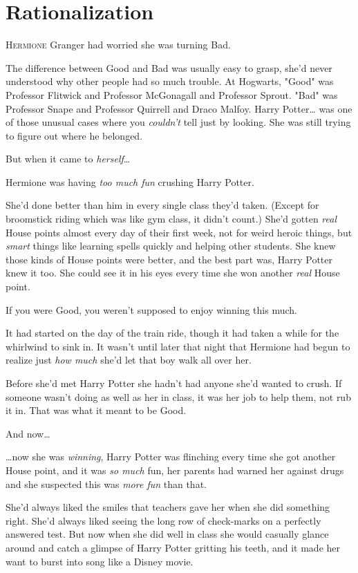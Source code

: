 \chapter{Rationalization}

\lettrine{H}{ermione} Granger had worried she was turning Bad.

The difference between Good and Bad was usually easy to grasp, she'd never
understood why other people had so much trouble. At Hogwarts, "Good" was
Professor Flitwick and Professor McGonagall and Professor Sprout. "Bad" was
Professor Snape and Professor Quirrell and Draco Malfoy. Harry Potter{\ldots}
was one of those unusual cases where you \emph{couldn't} tell just by looking.
She was still trying to figure out where he belonged.

But when it came to \emph{herself}{\ldots}

Hermione was having \emph{too much fun} crushing Harry Potter.

She'd done better than him in every single class they'd taken. (Except for
broomstick riding which was like gym class, it didn't count.) She'd gotten
\emph{real} House points almost every day of their first week, not for weird
heroic things, but \emph{smart} things like learning spells quickly and helping
other students. She knew those kinds of House points were better, and the best
part was, Harry Potter knew it too. She could see it in his eyes every time she
won another \emph{real} House point.

If you were Good, you weren't supposed to enjoy winning this much.

It had started on the day of the train ride, though it had taken a while for
the whirlwind to sink in. It wasn't until later that night that Hermione had
begun to realize just \emph{how much} she'd let that boy walk all over her.

Before she'd met Harry Potter she hadn't had anyone she'd wanted to crush. If
someone wasn't doing as well as her in class, it was her job to help them, not
rub it in. That was what it meant to be Good.

And now{\ldots}

{\ldots}now she was \emph{winning}, Harry Potter was flinching every time she
got another House point, and it was \emph{so much} fun, her parents had warned
her against drugs and she suspected this was \emph{more fun} than that.

She'd always liked the smiles that teachers gave her when she did something
right. She'd always liked seeing the long row of check-marks on a perfectly
answered test. But now when she did well in class she would casually glance
around and catch a glimpse of Harry Potter gritting his teeth, and it made her
want to burst into song like a Disney movie.

